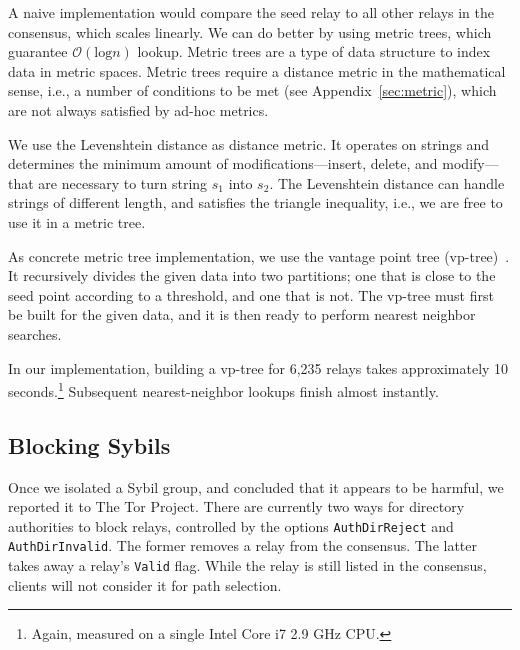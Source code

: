 A naive implementation would compare the seed relay to all other relays in the
consensus, which scales linearly.  We can do better by using metric trees, which
guarantee $\mathcal{O}(\textrm{log} n)$ lookup.  Metric trees are a type of data
structure to index data in metric spaces.  Metric trees require a distance
metric in the mathematical sense, i.e., a number of conditions to be met (see
Appendix~\ref{sec:metric}), which are not always satisfied by ad-hoc metrics.


We use the Levenshtein distance as distance metric.  It operates on strings and
determines the minimum amount of modifications---insert, delete, and
modify---that are necessary to turn string $s_{1}$ into $s_{2}$.  The
Levenshtein distance can handle strings of different length, and satisfies the
triangle inequality, i.e., we are free to use it in a metric tree.

As concrete metric tree implementation, we use the vantage point tree
(vp-tree)~\cite{Yianilos1993a}.  It recursively divides the given data into two
partitions; one that is close to the seed point according to a threshold,
and one that is not.  The vp-tree must first be built for the given data, and it
is then ready to perform nearest neighbor searches.


In our implementation, building a vp-tree for 6,235 relays takes approximately
10 seconds.\footnote{Again, measured on a single Intel Core i7 2.9 GHz CPU.}
Subsequent nearest-neighbor lookups finish almost instantly.


\subsection{Blocking Sybils}
Once we isolated a Sybil group, and concluded that it appears to be harmful, we
reported it to The Tor Project.  There are currently two ways for directory
authorities to block relays, controlled by the options \texttt{AuthDirReject}
and \texttt{AuthDirInvalid}.  The former removes a relay from the consensus.
The latter takes away a relay's \texttt{Valid} flag.  While the relay is still
listed in the consensus, clients will not consider it for path selection.

